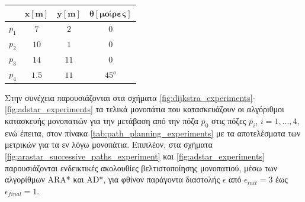 \bigskip 
\begin{table}[!ht]
	\centering
	\label{tab:path_planning_target_poses}
	\begin{tabular}{| c | c  c  c |} \hline
	 	& $\mathbf{x[m]}$ & $\mathbf{y[m]}$ & $\mathbf{\theta[μοίρες]}$  \\ \hline
 	   $p_1$ & $7$ & $2$ & $0$\\ 
  	   $p_2$ & $10$ & $1$ & $0$\\ 
   	   $p_3$ & $14$ & $11$ & $0$\\ 
		$p_4$ & $1.5$ & $11$ & $45^o$\\ \hline
   	\end{tabular}
\end{table}

Στην συνέχεια παρουσιάζονται στα σχήματα \ref{fig:dijkstra_experiments}-\ref{fig:adstar_experiments} τα τελικά μονοπάτια που κατασκευάζουν οι αλγόριθμοι κατασκευής μονοπατιών για την μετάβαση από την πόζα $p_0$ στις πόζες $p_i$, $i=1,...,4$, ενώ έπειτα, στον πίνακα \ref{tab:path_planning_experiments} με τα αποτελέσματα των μετρικών για τα εν λόγω μονοπάτια. Επιπλέον, στα σχήματα \ref{fig:arastar_successive_paths_experiment} και \ref{fig:adstar_experiments} παρουσιάζονται ενδεικτικές ακολουθίες βελτιστοποίησης μονοπατιού, μέσω των αλγορίθμων ARA* και AD*, για φθίνον παράγοντα διαστολής $\epsilon$ από $\epsilon_{init}=3$ έως $\epsilon_{final}=1$.

